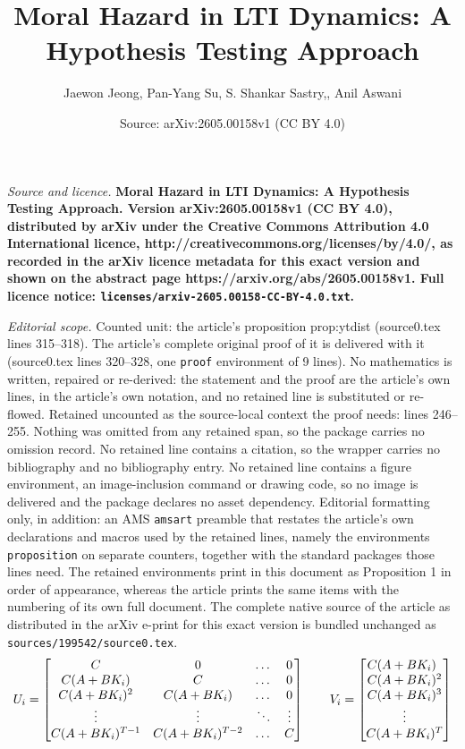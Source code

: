 \documentclass[10pt,a4paper]{amsart}
\title{\LARGE \bf Moral Hazard in LTI Dynamics: A Hypothesis Testing Approach}
\author{Jaewon Jeong, Pan-Yang Su, S. Shankar Sastry,, Anil Aswani}
\date{Source: arXiv:2605.00158v1 (CC BY 4.0)}
\begin{document}
\maketitle

\noindent\emph{Source and licence.} \LARGE \bf Moral Hazard in LTI Dynamics: A Hypothesis Testing Approach. Version arXiv:2605.00158v1 (CC BY 4.0), distributed by arXiv under the Creative Commons Attribution 4.0 International licence, http://creativecommons.org/licenses/by/4.0/, as recorded in the arXiv licence metadata for this exact version and shown on the abstract page https://arxiv.org/abs/2605.00158v1. Full licence notice: \texttt{licenses/arxiv-2605.00158-CC-BY-4.0.txt}.\par\smallskip

\noindent\textit{Editorial scope.} Counted unit: the article's proposition prop:ytdist (source0.tex lines 315--318). The article's complete original proof of it is delivered with it (source0.tex lines 320--328, one \texttt{proof} environment of 9 lines). No mathematics is written, repaired or re-derived: the statement and the proof are the article's own lines, in the article's own notation, and no retained line is substituted or re-flowed.  Retained uncounted as the source-local context the proof needs: lines 246--255.  Nothing was omitted from any retained span, so the package carries no omission record.  No retained line contains a citation, so the wrapper carries no bibliography and no bibliography entry.  No retained line contains a figure environment, an image-inclusion command or drawing code, so no image is delivered and the package declares no asset dependency.  Editorial formatting only, in addition: an AMS \texttt{amsart} preamble that restates the article's own declarations and macros used by the retained lines, namely the environments \texttt{proposition} on separate counters, together with the standard packages those lines need.  The retained environments print in this document as Proposition 1 in order of appearance, whereas the article prints the same items with the numbering of its own full document.  The complete native source of the article as distributed in the arXiv e-print for this exact version is bundled unchanged as \texttt{sources/199542/source0.tex}.
\begin{equation}
\label{eqn:uvw}
    U_i = \begin{bmatrix}
C & 0 & \dots & 0 \\
C(A+BK_i) & C & \dots & 0 \\
C(A+BK_i)^2 & C(A+BK_i) & \dots & 0 \\
\vdots & \vdots & \ddots & \vdots \\
C(A+BK_i)^{T-1} & C(A+BK_i)^{T-2} & \dots & C
\end{bmatrix}\qquad  V_i = \begin{bmatrix} C(A+BK_i)^{\hphantom{1}} \\ C(A+BK_i)^2 \\ C(A+BK_i)^3 \\ \vdots \\ C(A+BK_i)^T \end{bmatrix}
\end{equation}
\end{document}
